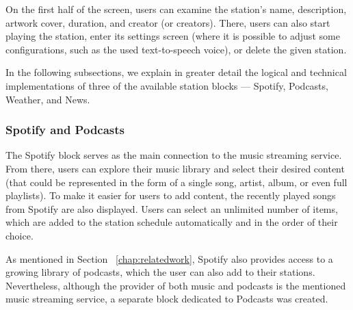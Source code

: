 On the first half of the screen, users can examine the station's name, description, artwork cover, duration, and creator (or creators). There, users can also start playing the station, enter its settings screen (where it is possible to adjust some configurations, such as the used text-to-speech voice), or delete the given station.

In the following subsections, we explain in greater detail the logical and technical implementations of three of the available station blocks — Spotify, Podcasts, Weather, and News. 


\subsubsection{Spotify and Podcasts}
\label{sub:spotify}

The Spotify block serves as the main connection to the music streaming service. From there, users can explore their music library and select their desired content (that could be represented in the form of a single song, artist, album, or even full playlists). To make it easier for users to add content, the recently played songs from Spotify are also displayed. Users can select an unlimited number of items, which are added to the station schedule automatically and in the order of their choice.

As mentioned in Section ~\ref{chap:relatedwork}, Spotify also provides access to a growing library of podcasts, which the user can also add to their stations. Nevertheless, although the provider of both music and podcasts is the mentioned music streaming service, a separate block dedicated to Podcasts was created.

